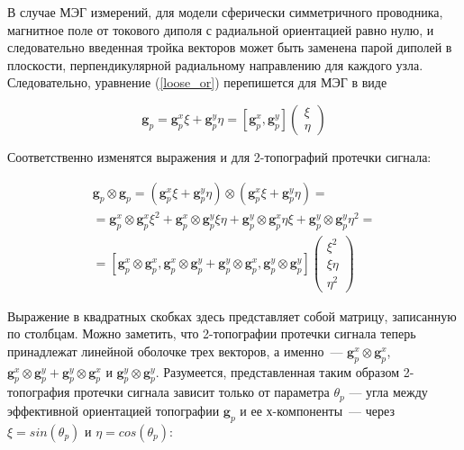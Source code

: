 В случае МЭГ измерений, для модели сферически симметричного проводника,
магнитное поле от токового диполя с радиальной ориентацией равно нулю, и следовательно
введенная тройка векторов может быть заменена парой диполей в плоскости,
перпендикулярной радиальному направлению для каждого узла.
Следовательно, уравнение (\ref{loose_or}) перепишется для МЭГ в виде

\begin{equation}
    \mathbf{g}_p = \mathbf{g}_p^x \xi + \mathbf{g}_p^y \eta = [\mathbf{g}_p^x, \mathbf{g}_p^y] \left(
    \begin{array}{ccc}
        \xi \\
        \eta
    \end{array}
    \right)
    \label{loose_or_meg}
\end{equation}

Соответственно изменятся выражения и для 2-топографий протечки сигнала:

\begin{gather}
    \mathbf{g}_p \otimes \mathbf{g}_p = (\mathbf{g}_p^x \xi
                                      + \mathbf{g}_p^y \eta) \otimes (\mathbf{g}_p^x \xi
                                      + \mathbf{g}_p^y \eta) = \nonumber \\
                                      = \mathbf{g}_p^x \otimes \mathbf{g}_p^x \xi^2
                                      + \mathbf{g}_p^x \otimes \mathbf{g}_p^y \xi \eta
                                      + \mathbf{g}_p^y\otimes  \mathbf{g}_p^x \eta \xi
                                      + \mathbf{g}_p^y \otimes \mathbf{g}_p^y \eta^2 = \nonumber \\
                                      = [\mathbf{g}_p^x \otimes \mathbf{g}_p^x,
                                         \mathbf{g}_p^x \otimes \mathbf{g}_p^y
                                      + \mathbf{g}_p^y \otimes \mathbf{g}_p^x,
                                        \mathbf{g}_p^y \otimes \mathbf{g}_p^y]
\left( \begin{array}{ccc}
\xi^2 \\
\xi \eta \\
\eta^2
\end{array}
\right)
\label{eq:orient_dip_comps}
\end{gather}

Выражение в квадратных скобках здесь представляет собой матрицу, записанную по столбцам.
Можно заметить,
что 2-топографии протечки сигнала теперь принадлежат линейной оболочке трех векторов,
а именно~---
$\mathbf{g}_p^x \otimes \mathbf{g}_p^x$, $\mathbf{g}_p^x \otimes \mathbf{g}_p^y +
\mathbf{g}_p^y \otimes \mathbf{g}_p^x$ и $\mathbf{g}_p^y \otimes \mathbf{g}_p^y$.
Разумеется, представленная таким образом 2-топография протечки сигнала зависит только от параметра
$\theta_p$ --- угла между эффективной ориентацией топографии $\mathbf{g}_p$ и ее $х$-компоненты~---
через $\xi = sin(\theta_p)$ и $\eta=cos(\theta_p)$:


